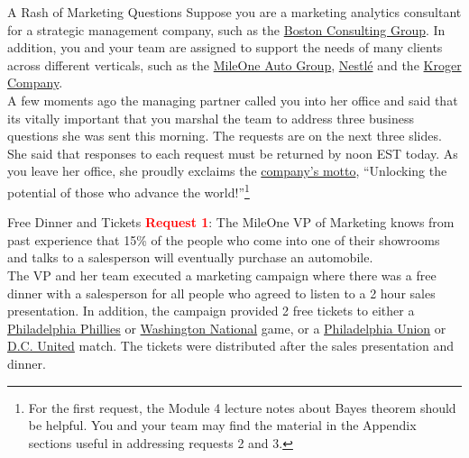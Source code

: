 \documentclass[pdf]{beamer}
\theoremstyle{remark}
\theoremstyle{definition}
\begin{document}
\begin{frame}[t]{A Rash of Marketing Questions}
Suppose you are a marketing analytics consultant for a strategic management company, such as the \href{https://www.bcg.com/about/overview}{Boston Consulting Group}.  In addition, you and your team are assigned to support the needs of many clients across different verticals, such as the \href{https://www.mileone.com/dealership/about.htm}{MileOne Auto Group}, \href{https://www.nestle.com/}{Nestl\'{e}} and the \href{https://www.thekrogerco.com/}{Kroger Company}. \\
\vspace{1.5ex}
A few moments ago the managing partner called you into her office and said that its vitally important that you marshal the team to address three business questions she was sent this morning.  The requests are on the next three slides.  She said that responses to each request must be returned by noon EST today.  As you leave her office, she proudly exclaims the \href{https://www.bcg.com/about/overview}{company's motto}, ``Unlocking the potential of those who advance the world!''\footnote{For the first request, the Module 4 lecture notes about Bayes theorem should be helpful.  You and your team may find the material in the Appendix sections useful in addressing requests 2 and 3.} 

\end{frame}

\begin{frame}[t]{Free Dinner and Tickets}
\textcolor{red}{\textbf{Request 1}}:  The MileOne VP of Marketing knows from past experience that 15\% of the people who come into one of their showrooms and talks to a salesperson will eventually purchase an automobile.  \\
\vspace{1.5ex}
The VP and her team executed a marketing campaign where there was a free dinner with a salesperson for all people who agreed to listen to a 2 hour sales presentation.  In addition, the campaign provided 2 free tickets to either a \href{https://www.mlb.com/phillies}{Philadelphia Phillies} or \href{https://www.mlb.com/nationals}{Washington National} game, or a \href{https://www.philadelphiaunion.com/}{Philadelphia Union} or \href{https://www.dcunited.com/}{D.C. United} match.  The tickets were distributed after the sales presentation and dinner. 
\end{frame}
\end{document}
